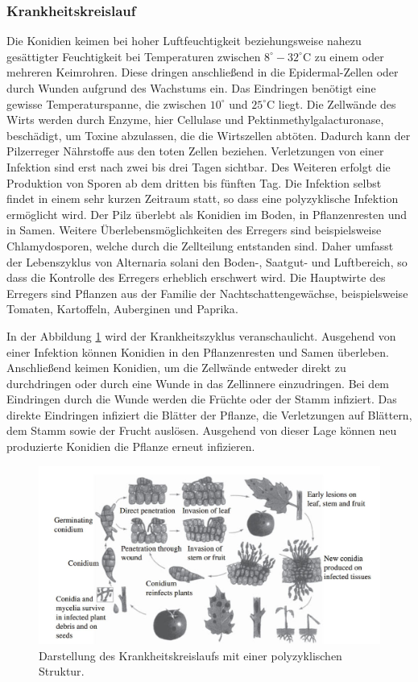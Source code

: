 \subsubsection{Krankheitskreislauf}

Die Konidien keimen bei hoher Luftfeuchtigkeit beziehungsweise nahezu gesättigter Feuchtigkeit bei Temperaturen zwischen $8^\circ - 32^\circ\text{C}$ zu einem oder mehreren Keimrohren. Diese dringen anschließend in die Epidermal-Zellen oder durch Wunden aufgrund des Wachstums ein. Das Eindringen benötigt eine gewisse Temperaturspanne, die zwischen $10^\circ$ und $25^\circ\text{C}$ liegt. Die Zellwände des Wirts werden durch Enzyme, hier Cellulase und Pektinmethylgalacturonase, beschädigt, um Toxine abzulassen, die die Wirtszellen abtöten. Dadurch kann der Pilzerreger Nährstoffe aus den toten Zellen beziehen. Verletzungen von einer Infektion sind erst nach zwei bis drei Tagen sichtbar. Des Weiteren erfolgt die Produktion von Sporen ab dem dritten bis fünften Tag. Die Infektion selbst findet in einem sehr kurzen Zeitraum statt, so dass eine polyzyklische Infektion ermöglicht wird. Der Pilz überlebt als Konidien im Boden, in Pflanzenresten und in Samen. Weitere Überlebensmöglichkeiten des Erregers sind beispielsweise Chlamydosporen, welche durch die Zellteilung entstanden sind. Daher umfasst der Lebenszyklus von Alternaria solani den Boden-, Saatgut- und Luftbereich, so dass die Kontrolle des Erregers erheblich erschwert wird. Die Hauptwirte des Erregers sind Pflanzen aus der Familie der Nachtschattengewächse, beispielsweise Tomaten, Kartoffeln, Auberginen und Paprika\cite{solani}.

In der Abbildung \ref{solani_circle} wird der Krankheitszyklus veranschaulicht. Ausgehend von einer Infektion können Konidien in den Pflanzenresten und Samen überleben. Anschließend keimen Konidien, um die Zellwände entweder direkt zu durchdringen oder durch eine Wunde in das Zellinnere einzudringen. Bei dem Eindringen durch die Wunde werden die Früchte oder der Stamm infiziert. Das direkte Eindringen infiziert die Blätter der Pflanze, die Verletzungen auf Blättern, dem Stamm sowie der Frucht auslösen. Ausgehend von dieser Lage können neu produzierte Konidien die Pflanze erneut infizieren.  

\begin{figure}[h!]
	\centering
	\includegraphics[width=\textwidth]{bilder/solani_circle.jpg}
	\caption{Darstellung des Krankheitskreislaufs mit einer polyzyklischen Struktur\cite{solani}.}
	\label{solani_circle}
\end{figure}



